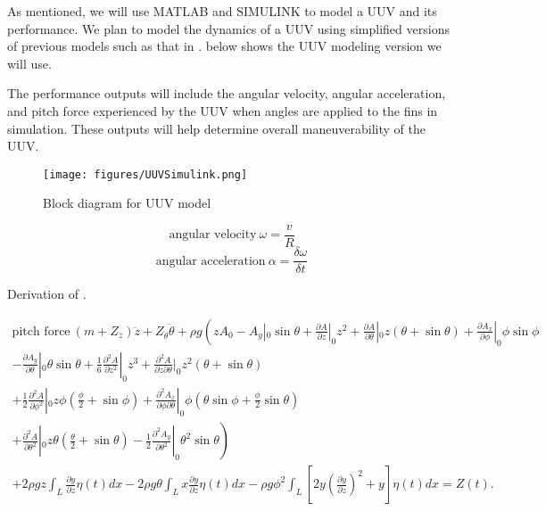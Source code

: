 \documentclass{IEEEtran}
\begin{document}
As mentioned, we will use MATLAB and SIMULINK to model a UUV and its performance. We plan to model the dynamics of a UUV using simplified versions of previous models such as that in
\cite{liu2005mimicry}.  below shows the UUV modeling version we will use.

The performance outputs will include the angular velocity, angular acceleration, and pitch force experienced by the UUV when angles are applied to the fins in simulation. These outputs will help determine overall maneuverability of the UUV.
\begin{figure*}
\begin{center}
\texttt{[image: figures/UUVSimulink.png]}
\end{center}
\caption{Block diagram for UUV model}
\label{fig:5}
\end{figure*}
\begin{equation}
\mbox{angular velocity}\ \omega = \frac{v}{R} 
\label{eq:1}
\end{equation}
\begin{equation}
\mbox{angular acceleration}\ \alpha = \frac{\delta\omega}{\delta t}
\label{eq:2}
\end{equation}
\begin{table*}
\caption{Derivation of .} %
\begin{multline}
\mbox{pitch force}\ 
(m+Z_{\ddot{z}}) \ddot{z} + Z_{\ddot{\theta}} \ddot{\theta} + \rho g \left( z A_0 - A_y|_0 \sin{\theta} + \frac{\partial A}{\partial z}|_0 z^2 + \frac{\partial A}{\partial\theta}|_0 z(\theta + \sin{\theta}) + \frac{\partial A_x}{\partial\phi}|_0 \phi\sin{\phi} \right. \\
-\frac{\partial A_y}{\partial\theta}|_0 \theta\sin{\theta} + \frac{1}{6}\frac{\partial^2 A}{\partial z^2}|_0 z^3 + \frac{\partial^2 A}{\partial z\partial\theta}|_0 z^2(\theta+\sin{\theta}) \\
+ \frac{1}{2}\frac{\partial^2 A}{\partial\phi^2}|_0 z\phi(\frac{\phi}{2}+\sin{\phi}) + \frac{\partial^2 A_x}{\partial\phi\partial\theta}|_0 \phi(\theta\sin{\phi}+\frac{\phi}{2}\sin{\theta}) \\
\left. + \frac{\partial^2 A}{\partial\theta^2}|_0 z\theta(\frac{\theta}{2}+\sin{\theta}) - \frac{1}{2}\frac{\partial^2 A_y}{\partial\theta^2}|_0 \theta^2\sin{\theta} \right) \\
+ 2\rho g z \int_L \frac{\partial y}{\partial z} \eta(t)dx 
- 2\rho g \theta \int_L x\frac{\partial y}{\partial z}\eta(t) dx 
- \rho g \phi^2 \int_L \left[ 2y \left(\frac{\partial y}{\partial z}\right)^2 + y \right] \eta(t) dx
= Z(t).
\label{eq:3}
\end{multline}
\end{table*}
\end{document}
